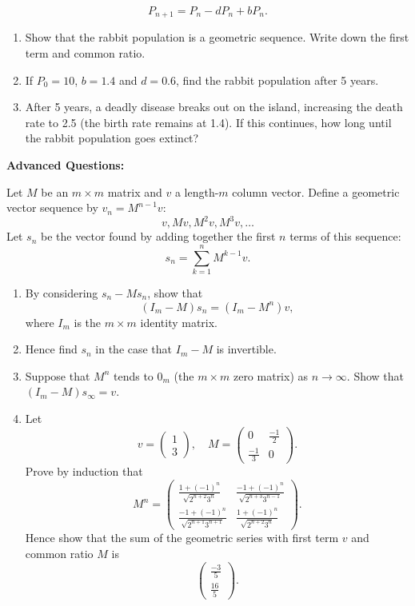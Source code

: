 \documentclass{article}
\begin{document}
\begin{enumerate}
		\[P_{n+1}=P_n - dP_n + bP_n.\]
		\begin{enumerate}
			\item Show that the rabbit population is a geometric sequence. Write down the first term and common ratio.
			\item If $P_0=10$, $b=1.4$ and $d=0.6$, find the rabbit population after 5 years.
			\item After 5 years, a deadly disease breaks out on the island, increasing the death rate to 2.5 (the birth rate remains at 1.4). If this continues, how long until the rabbit population goes extinct?
		\end{enumerate}
\end{enumerate}


\clearpage


\textbf{Advanced Questions:}\bigskip

Let $M$ be an $m\times m$ matrix and $v$ a length-$m$ column vector. Define a geometric vector sequence by $v_n=M^{n-1}v$:
\[v, Mv, M^2v, M^3v, \hdots\]
Let $s_n$ be the vector found by adding together the first $n$ terms of this sequence:
\[s_n=\sum_{k=1}^n M^{k-1}v.\]
\begin{enumerate}
	\item By considering $s_n-Ms_n$, show that
		\[(I_m-M)s_n = (I_m-M^n)v,\]
		where $I_m$ is the $m\times m$ identity matrix.
	\item Hence find $s_n$ in the case that $I_m-M$ is invertible.
	\item Suppose that $M^n$ tends to $0_m$ (the $m\times m$ zero matrix) as $n\to \infty$. Show that $(I_m-M)s_\infty = v$.
	\item Let
		\[v=\left(\begin{array}{c}1\\3\end{array}\right), \quad M=\left(\begin{array}{cc} 0 & \frac{-1}{2}\\ \frac{-1}{3} & 0\end{array}\right).\]
		Prove by induction that
		\[M^n = \left(\begin{array}{cc}\frac{1+(-1)^n}{\sqrt{2^{n+2}3^n}} & \frac{-1+(-1)^n}{\sqrt{2^{n+3}3^{n-1}}} \\ \frac{-1+(-1)^n}{\sqrt{2^{n+1}3^{n+1}}} &  \frac{1+(-1)^n}{\sqrt{2^{n+2}3^n}} \end{array}\right).\]
		Hence show that the sum of the geometric series with first term $v$ and common ratio $M$ is
			\[\left(\begin{array}{c} \frac{-3}{5}\\ \frac{16}{5}\end{array}\right).\]
\end{enumerate}
\end{document}
